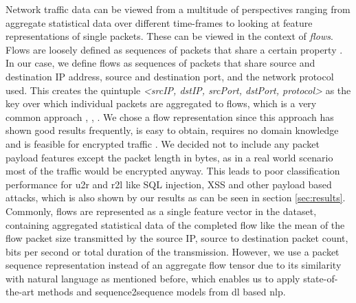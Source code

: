 Network traffic data can be viewed from a multitude of perspectives ranging from aggregate statistical data over different time-frames \cite{kitsune} to looking at feature representations of single packets. These can be viewed in the context of \textit{flows}.
Flows are loosely defined as sequences of packets that share a certain property \cite{adversarial_recurrent_ids}. In our case, we define flows as sequences of packets that share source and destination IP address, source and destination port, and the network protocol used. This creates the quintuple \textit{<srcIP, dstIP, srcPort, dstPort, protocol>} as the key over which individual packets are aggregated to flows, which is a very common approach \cite{caia_vector}, \cite{unsw_nb15}, \cite{feature_vectors}. We chose a flow representation since this approach has shown good results frequently, is easy to obtain, requires no domain knowledge and is feasible for encrypted traffic \cite{feature_vectors}. We decided not to include any packet payload features except the packet length in bytes, as in a real world scenario most of the traffic would be encrypted anyway. This leads to poor classification performance for \gls{u2r} and \gls{r2l} \cite{nsl_kdd} like SQL injection, XSS and other payload based attacks, which is also shown by our results as can be seen in section \ref{sec:results}. Commonly, flows are represented as a single feature vector in the dataset, containing aggregated statistical data of the completed flow like the mean of the flow packet size transmitted by the source IP, source to destination packet count, bits per second or total duration of the transmission. However, we use a packet sequence representation instead of an aggregate flow tensor due to its similarity with natural language as mentioned before, which enables us to apply state-of-the-art methods and sequence2sequence models from \gls{dl} based \gls{nlp}. 


